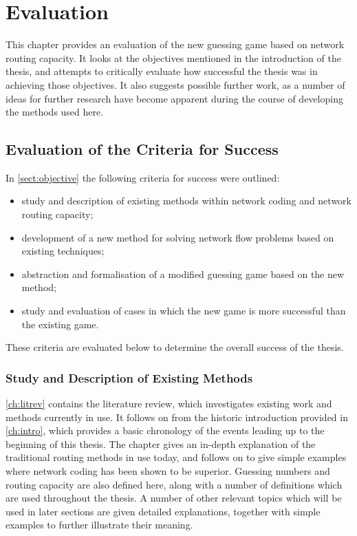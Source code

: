 
\chapter{Evaluation}
\label{ch:eval}

This chapter provides an evaluation of the new guessing game based on network routing capacity. It looks at the objectives mentioned in the introduction of the thesis, and attempts to critically evaluate how successful the thesis was in achieving those objectives. It also suggests possible further work, as a number of ideas for further research have become apparent during the course of developing the methods used here.

\section{Evaluation of the Criteria for Success}

In \autoref{sect:objective} the following criteria for success were outlined:

\begin{itemize}
	\item{study and description of existing methods within network coding and network routing capacity;}
 	\item{development of a new method for solving network flow problems based on existing techniques;}
 	\item{abstraction and formalisation of a modified guessing game based on the new method;}
 	\item{study and evaluation of cases in which the new game is more successful than the existing game.}
\end{itemize}

These criteria are evaluated below to determine the overall success of the thesis.

\subsection{Study and Description of Existing Methods}

\autoref{ch:litrev} contains the literature review, which investigates existing work and methods currently in use. It follows on from the historic introduction provided in \autoref{ch:intro}, which provides a basic chronology of the events leading up to the beginning of this thesis. The chapter gives an in-depth explanation of the traditional routing methods in use today, and follows on to give simple examples where network coding has been shown to be superior. Guessing numbers and routing capacity are also defined here, along with a number of definitions which are used throughout the thesis. A number of other relevant topics which will be used in later sections are given detailed explanations, together with simple examples to further illustrate their meaning.

